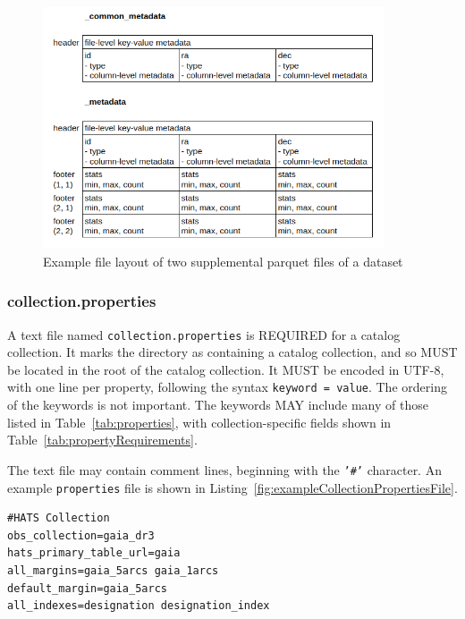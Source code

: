 \documentclass[11pt,a4paper]{ivoa}
\begin{document}
\begin{figure}
\centering
\includegraphics[width=0.9\textwidth]{metadata_files.png}
\caption{Example file layout of two supplemental parquet files of a dataset}
\label{fig:parquetMetadata}
\end{figure}

\subsubsection{collection.properties}\label{sec:collectionProperties}
A text file named \texttt{collection.properties} is REQUIRED for a catalog collection.
It marks the directory as containing a catalog collection, and so MUST be located in the 
root of the catalog collection.
It MUST be encoded in UTF-8, with one line per property, following the syntax \texttt{keyword = value}.
The ordering of the keywords is not important. 
The keywords MAY include many of those listed in Table~\ref{tab:properties}, with collection-specific fields shown in Table~\ref{tab:propertyRequirements}.

The text file may contain comment lines, beginning with the \texttt{'\#'} character.
An example \texttt{properties} file is shown in Listing~\ref{fig:exampleCollectionPropertiesFile}.

\begin{minipage}{\linewidth}
\begin{lstlisting}[caption=Example \texttt{collection.properties} file contents, label=fig:exampleCollectionPropertiesFile]
#HATS Collection
obs_collection=gaia_dr3
hats_primary_table_url=gaia
all_margins=gaia_5arcs gaia_1arcs
default_margin=gaia_5arcs
all_indexes=designation designation_index
\end{lstlisting}
\end{minipage}
\end{document}
